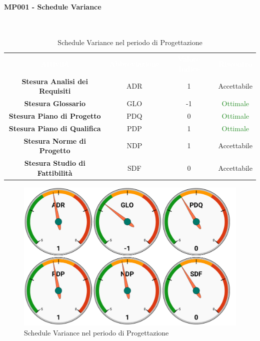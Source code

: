 \paragraph{MP001 - Schedule Variance}\mbox{}\\[0,3cm]
\begin{table}[H]
    \centering
    \begin{tabular}{cccc}
        \rowcolor{greySWEight}
        \textcolor{white}{\textbf{Attività}} & 
        \textcolor{white}{\textbf{Abbreviazione}} &
        \textcolor{white}{\textbf{Valore Indice}}&
        \textcolor{white}{\textbf{Riscontro}}\\
		\textbf{Stesura Analisi dei Requisiti} & ADR & 1 & \textcolor{YellowOrange}{Accettabile}\\
		\textbf{Stesura Glossario} & GLO & -1 & \textcolor{ForestGreen}{Ottimale} \\
		\textbf{Stesura Piano di Progetto} & PDQ & 0 & \textcolor{ForestGreen}{Ottimale} \\
		\textbf{Stesura Piano di Qualifica} & PDP & 1 & \textcolor{ForestGreen}{Ottimale} \\
		\textbf{Stesura Norme di Progetto} & NDP & 1 & \textcolor{YellowOrange}{Accettabile} \\
		\textbf{Stesura Studio di Fattibilità} & SDF & 0 & \textcolor{YellowOrange}{Accettabile} \\

    \end{tabular}
    \caption{Schedule Variance nel periodo di Progettazione}
\end{table}
\begin{figure}[H]
    \centering
	\includegraphics[width=1\linewidth]{sez/App_Esito/Progettazione/graph/PR_SV.pdf}
	\caption{Schedule Variance nel periodo di Progettazione}
\end{figure}

